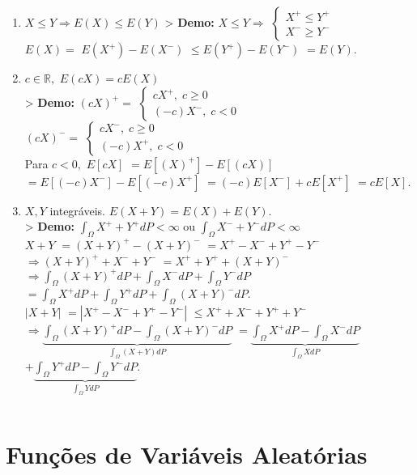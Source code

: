 \documentclass[
]{book}
\begin{document}
\begin{enumerate}
\def\labelenumi{(\arabic{enumi})}
\item
  \(X \leq Y \Rightarrow E(X) \leq E(Y)\)
  \textgreater{} \textbf{Demo:} \(X \leq Y \Rightarrow\) \(\left\{\begin{array}{c}X^+ \leq Y^+\\ X^- \geq Y^-\end{array}\right.\)\\
  \(E(X) =\) \(E(X^+) - E(X^-)\) \(\leq E(Y^+) - E(Y^-)\) \(=E(Y).\)
\item
  \(c \in \mathbb{R},\) \(E(cX) = cE(X)\)\\
  \textgreater{} \textbf{Demo:} \((cX)^+ =\) \(\left\{\begin{array}{c}cX^+, \; c \geq 0\\ (-c)X^-, \; c < 0 \end{array}\right.\)\\
  \((cX)^- =\) \(\left\{\begin{array}{c}cX^-, \; c \geq 0\\ (-c)X^+, \; c < 0 \end{array}\right.\)\\
  Para \(c < 0,\) \(E[cX]\) \(= E[(X)^+] - E[(cX)]\) \(= E[(-c)X^-] - E[(-c)X^+]\) \(= (-c)E[X^-] + cE[X^+]\) \(= cE[X]\).
\item
  \(X,Y\) integráveis. \(E(X+Y) = E(X) + E(Y).\)\\
  \textgreater{} \textbf{Demo:} \(\int_\Omega X^+ + Y^+ dP < \infty\) ou \(\int_\Omega X^- + Y^- dP < \infty\)\\
  \(X + Y\) \(= (X + Y)^+ - (X+Y)^-\) \(= X^+ - X^- + Y^+ - Y^-\)\\
  \(\Rightarrow (X+Y)^+ + X^- + Y^-\) \(= X^+ + Y^+ + (X+Y)^-\)\\
  \(\Rightarrow \int_\Omega (X+Y)^+dP + \int_\Omega X^-dP + \int_\Omega Y^-dP\)\\
  \(=\int_\Omega X^+dP + \int_\Omega Y^+dP + \int_\Omega (X+Y)^-dP\).\\
  \(|X+Y|\) \(= |X^+-X^-+Y^+-Y^-|\) \(\leq X^++X^-+Y^++Y^-\)\\
  \(\Rightarrow \underbrace{\int_\Omega (X+Y)^+dP - \int_\Omega(X+Y)^-dP}_{\int_\Omega(X+Y)dP}\) \(= \underbrace{\int_\Omega X^+dP -\int_\Omega X^-dP}_{\int_\Omega XdP}\) \(+ \underbrace{\int_\Omega Y^+dP -\int_\Omega Y^-dP}_{\int_\Omega YdP}\).
\end{enumerate}

\(~\)

\hypertarget{funuxe7uxf5es-de-variuxe1veis-aleatuxf3rias}{%
\section{Funções de Variáveis Aleatórias}\label{funuxe7uxf5es-de-variuxe1veis-aleatuxf3rias}}
\end{document}
